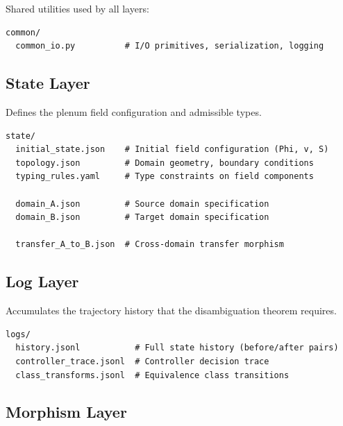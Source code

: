 \documentclass[12pt, oneside]{article}
\begin{document}
Shared utilities used by all layers:
\begin{verbatim}
common/
  common_io.py          # I/O primitives, serialization, logging
\end{verbatim}

\subsection{State Layer}

Defines the plenum field configuration and admissible types.
\begin{verbatim}
state/
  initial_state.json    # Initial field configuration (Phi, v, S)
  topology.json         # Domain geometry, boundary conditions
  typing_rules.yaml     # Type constraints on field components

  domain_A.json         # Source domain specification
  domain_B.json         # Target domain specification

  transfer_A_to_B.json  # Cross-domain transfer morphism
\end{verbatim}

\subsection{Log Layer}

Accumulates the trajectory history that the disambiguation theorem requires.
\begin{verbatim}
logs/
  history.jsonl           # Full state history (before/after pairs)
  controller_trace.jsonl  # Controller decision trace
  class_transforms.jsonl  # Equivalence class transitions
\end{verbatim}

\subsection{Morphism Layer}
\end{document}
